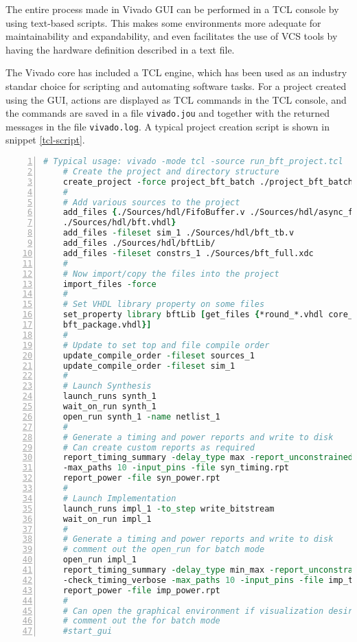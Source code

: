 The entire process made in Vivado GUI can be performed in a TCL console by using text-based scripts. This makes some environments more adequate for maintainability and expandability, and even facilitates the use of VCS tools by having the hardware definition described in a text file.

The Vivado core has included a TCL engine, which has been used as an industry standar choice for scripting and automating software tasks. For a project created using the GUI, actions are displayed as TCL commands in the TCL console, and the commands are saved in a file \texttt{vivado.jou} and together with the returned messages in the file \texttt{vivado.log}. A typical project creation script is shown in snippet \ref{tcl-script}.

\begin{lstlisting}[language=tcl, basicstyle=\scriptsize\ttfamily, tabsize=2, commentstyle=\color{darkgray}, keywordstyle=\color{blue}, backgroundcolor=\color{lightgray}, morekeywords={create_project, add_files, import_files, set_property, update_compile_order, launch_runs, wait_on_run, open_run, report_timming_summary, report_power}, breaklines=true, numbers=left, float=htb, caption={TCL project creation example, from \ref{UG895}}, label={tcl-script}]
	# Typical usage: vivado -mode tcl -source run_bft_project.tcl
	# Create the project and directory structure
	create_project -force project_bft_batch ./project_bft_batch -part xc7z010-clg225-1
	#
	# Add various sources to the project
	add_files {./Sources/hdl/FifoBuffer.v ./Sources/hdl/async_fifo.v \
	./Sources/hdl/bft.vhdl}
	add_files -fileset sim_1 ./Sources/hdl/bft_tb.v
	add_files ./Sources/hdl/bftLib/
	add_files -fileset constrs_1 ./Sources/bft_full.xdc
	#
	# Now import/copy the files into the project
	import_files -force
	#
	# Set VHDL library property on some files
	set_property library bftLib [get_files {*round_*.vhdl core_transform.vhdl \
	bft_package.vhdl}]
	#
	# Update to set top and file compile order
	update_compile_order -fileset sources_1
	update_compile_order -fileset sim_1
	#
	# Launch Synthesis
	launch_runs synth_1
	wait_on_run synth_1
	open_run synth_1 -name netlist_1
	#
	# Generate a timing and power reports and write to disk
	# Can create custom reports as required
	report_timing_summary -delay_type max -report_unconstrained -check_timing_verbose \
	-max_paths 10 -input_pins -file syn_timing.rpt
	report_power -file syn_power.rpt
	#
	# Launch Implementation
	launch_runs impl_1 -to_step write_bitstream
	wait_on_run impl_1
	#
	# Generate a timing and power reports and write to disk
	# comment out the open_run for batch mode
	open_run impl_1
	report_timing_summary -delay_type min_max -report_unconstrained \
	-check_timing_verbose -max_paths 10 -input_pins -file imp_timing.rpt
	report_power -file imp_power.rpt
	#
	# Can open the graphical environment if visualization desired
	# comment out the for batch mode
	#start_gui
\end{lstlisting}

